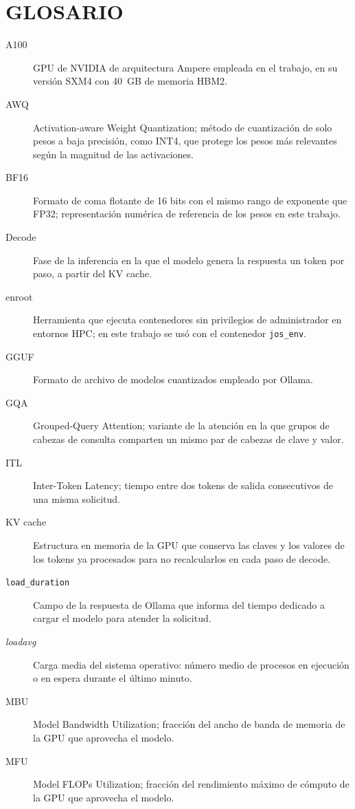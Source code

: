 \clearpage
\chapter*{GLOSARIO}

\begin{description}
  \item[A100] GPU de NVIDIA de arquitectura Ampere empleada en el trabajo, en su versión SXM4 con 40~GB de memoria HBM2.
  \item[AWQ] Activation-aware Weight Quantization; método de cuantización de solo pesos a baja precisión, como INT4, que protege los pesos más relevantes según la magnitud de las activaciones.
  \item[BF16] Formato de coma flotante de 16 bits con el mismo rango de exponente que FP32; representación numérica de referencia de los pesos en este trabajo.
  \item[Decode] Fase de la inferencia en la que el modelo genera la respuesta un token por paso, a partir del KV cache.
  \item[enroot] Herramienta que ejecuta contenedores sin privilegios de administrador en entornos HPC; en este trabajo se usó con el contenedor \texttt{jos\_env}.
  \item[GGUF] Formato de archivo de modelos cuantizados empleado por Ollama.
  \item[GQA] Grouped-Query Attention; variante de la atención en la que grupos de cabezas de consulta comparten un mismo par de cabezas de clave y valor.
  \item[ITL] Inter-Token Latency; tiempo entre dos tokens de salida consecutivos de una misma solicitud.
  \item[KV cache] Estructura en memoria de la GPU que conserva las claves y los valores de los tokens ya procesados para no recalcularlos en cada paso de decode.
  \item[\texttt{load\_duration}] Campo de la respuesta de Ollama que informa del tiempo dedicado a cargar el modelo para atender la solicitud.
  \item[\textit{loadavg}] Carga media del sistema operativo: número medio de procesos en ejecución o en espera durante el último minuto.
  \item[MBU] Model Bandwidth Utilization; fracción del ancho de banda de memoria de la GPU que aprovecha el modelo.
  \item[MFU] Model FLOPs Utilization; fracción del rendimiento máximo de cómputo de la GPU que aprovecha el modelo.

\end{description}
